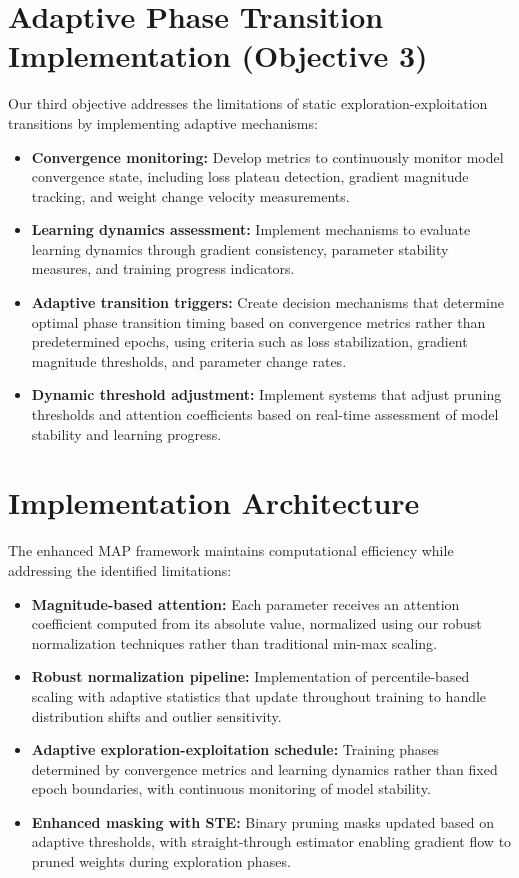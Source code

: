 \documentclass[12pt,a4paper]{report}
\begin{document}
\section{Adaptive Phase Transition Implementation (Objective 3)}
Our third objective addresses the limitations of static exploration-exploitation transitions by implementing adaptive mechanisms:
\begin{itemize}
    \item \textbf{Convergence monitoring:} Develop metrics to continuously monitor model convergence state, including loss plateau detection, gradient magnitude tracking, and weight change velocity measurements.
    \item \textbf{Learning dynamics assessment:} Implement mechanisms to evaluate learning dynamics through gradient consistency, parameter stability measures, and training progress indicators.
    \item \textbf{Adaptive transition triggers:} Create decision mechanisms that determine optimal phase transition timing based on convergence metrics rather than predetermined epochs, using criteria such as loss stabilization, gradient magnitude thresholds, and parameter change rates.
    \item \textbf{Dynamic threshold adjustment:} Implement systems that adjust pruning thresholds and attention coefficients based on real-time assessment of model stability and learning progress.
\end{itemize}

\section{Implementation Architecture}
The enhanced MAP framework maintains computational efficiency while addressing the identified limitations:
\begin{itemize}
    \item \textbf{Magnitude-based attention:} Each parameter receives an attention coefficient computed from its absolute value, normalized using our robust normalization techniques rather than traditional min-max scaling.
    \item \textbf{Robust normalization pipeline:} Implementation of percentile-based scaling with adaptive statistics that update throughout training to handle distribution shifts and outlier sensitivity.
    \item \textbf{Adaptive exploration-exploitation schedule:} Training phases determined by convergence metrics and learning dynamics rather than fixed epoch boundaries, with continuous monitoring of model stability.
    \item \textbf{Enhanced masking with STE:} Binary pruning masks updated based on adaptive thresholds, with straight-through estimator enabling gradient flow to pruned weights during exploration phases.
\end{itemize}
\end{document}
